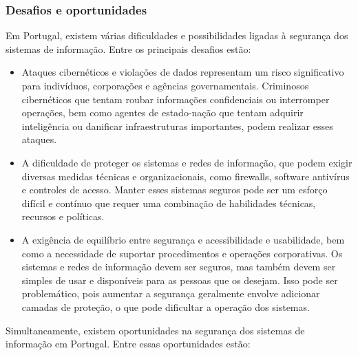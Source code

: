 \subsubsection{Desafios e oportunidades}

Em Portugal, existem várias dificuldades e possibilidades ligadas à segurança dos sistemas de informação. Entre os principais desafios estão:

\begin{itemize}
  \item Ataques cibernéticos e violações de dados representam um risco significativo para indivíduos, corporações e agências governamentais. Criminosos cibernéticos que tentam roubar informações confidenciais ou interromper operações, bem como agentes de estado-nação que tentam adquirir inteligência ou danificar infraestruturas importantes, podem realizar esses ataques.
  \item A dificuldade de proteger os sistemas e redes de informação, que podem exigir diversas medidas técnicas e organizacionais, como firewalls, software antivírus e controles de acesso. Manter esses sistemas seguros pode ser um esforço difícil e contínuo que requer uma combinação de habilidades técnicas, recursos e políticas.
  \item A exigência de equilíbrio entre segurança e acessibilidade e usabilidade, bem como a necessidade de suportar procedimentos e operações corporativas. Os sistemas e redes de informação devem ser seguros, mas também devem ser simples de usar e disponíveis para as pessoas que os desejam. Isso pode ser problemático, pois aumentar a segurança geralmente envolve adicionar camadas de proteção, o que pode dificultar a operação dos sistemas.
\end{itemize}

Simultaneamente, existem oportunidades na segurança dos sistemas de informação em Portugal. Entre essas oportunidades estão:


